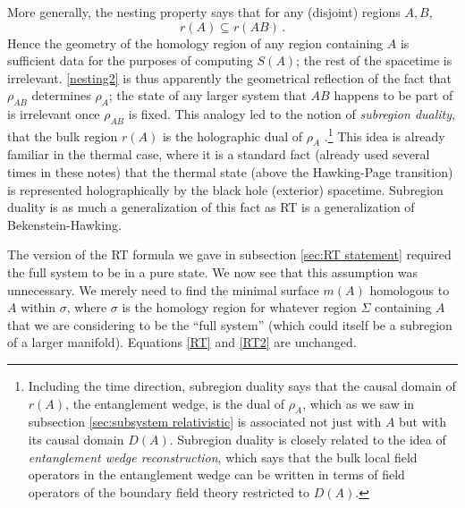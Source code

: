 \documentclass[11pt]{article}
\begin{document}
More generally, the nesting property says that for any (disjoint) regions $A,B$,
\begin{equation}\label{nesting2}
r(A)\subseteq r(AB)\,.
\end{equation}
Hence the geometry of the homology region of any region containing $A$ is sufficient data for the purposes of computing $S(A)$; the rest of the spacetime is irrelevant. \eqref{nesting2} is thus apparently the geometrical reflection of the fact that $\rho_{AB}$ determines $\rho_A$; the state of any larger system that $AB$ happens to be part of is irrelevant once $\rho_{AB}$ is fixed. This analogy led to the notion of \emph{subregion duality}, that the bulk region $r(A)$ is the holographic dual of $\rho_A$ \cite{Czech:2012bh,Headrick:2013zda,Headrick:2014cta}.\footnote{Including the time direction, subregion duality says that the causal domain of $r(A)$, the entanglement wedge, is the dual of $\rho_A$, which as we saw in subsection \ref{sec:subsystem relativistic} is associated not just with $A$ but with its causal domain $D(A)$. Subregion duality is closely related to the idea of \emph{entanglement wedge reconstruction}, which says that the bulk local field operators in the entanglement wedge can be written in terms of field operators of the boundary field theory restricted to $D(A)$.} This idea is already familiar in the thermal case, where it is a standard fact (already used several times in these notes) that the thermal state (above the Hawking-Page transition) is represented holographically by the black hole (exterior) spacetime. Subregion duality is as much a generalization of this fact as RT is a generalization of Bekenstein-Hawking.

The version of the RT formula we gave in subsection \ref{sec:RT statement} required the full system to be in a pure state. We now see that this assumption was unnecessary. We merely need to find the minimal surface $m(A)$ homologous to $A$ within $\sigma$, where $\sigma$ is the homology region for whatever region $\Sigma$ containing $A$ that we are considering to be the ``full system'' (which could itself be a subregion of a larger manifold). Equations \eqref{RT} and \eqref{RT2} are unchanged.
\end{document}
